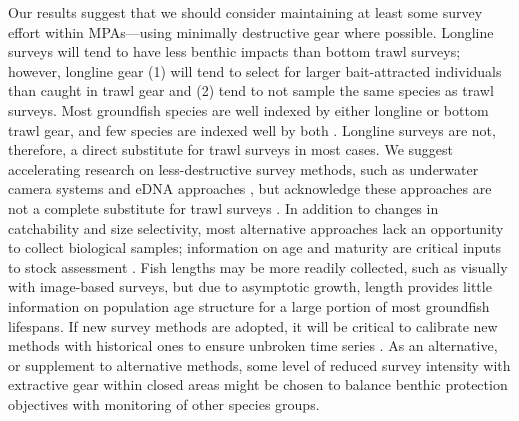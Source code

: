 \documentclass[12pt]{article}
\begin{document}
Our results suggest that we should consider maintaining at least some survey effort within MPAs---using minimally destructive gear where possible.
Longline surveys will tend to have less benthic impacts than bottom trawl surveys; however, longline gear (1) will tend to select for larger bait-attracted individuals than caught in trawl gear and (2) tend to not sample the same species as trawl surveys.
Most groundfish species are well indexed by either longline or bottom trawl gear, and few species are indexed well by both \citep[e.g.,][]{anderson2019synopsis}.
Longline surveys are not, therefore, a direct substitute for trawl surveys in most cases.
We suggest accelerating research on less-destructive survey methods, such as underwater camera systems
\citep[e.g.,][]{trenkel2004, rooper2012, bryan2023} and eDNA approaches \citep[e.g.,][]{rourke2022, he2023}, but acknowledge these approaches are not a complete substitute for trawl surveys \citep{benoit2020national}.
In addition to changes in catchability and size selectivity, most alternative approaches lack an opportunity to collect biological samples; information on age and maturity are critical inputs to stock assessment \citep[e.g.,][]{magnusson2007}.
Fish lengths may be more readily collected, such as visually with image-based surveys, but due to asymptotic growth, length provides little information on population age structure for a large portion of most groundfish lifespans.
If new survey methods are adopted, it will be critical to calibrate new methods with historical ones to ensure unbroken time series \citep{field2006}.
As an alternative, or supplement to alternative methods, some level of reduced survey intensity with extractive gear within closed areas might be chosen to balance benthic protection objectives with monitoring of other species groups.
\end{document}
